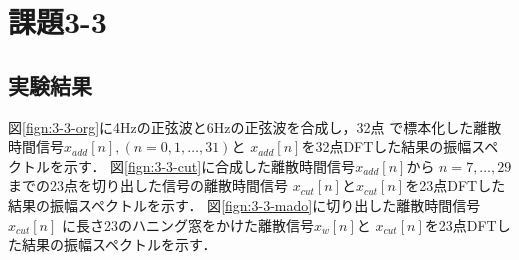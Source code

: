 \documentclass[11pt, a4paper, titlepage]{ltjsarticle}
\begin{document}
\newpage
\section*{課題3-3}
\subsection*{実験結果}
図\ref*{fign:3-3-org}に4Hzの正弦波と6Hzの正弦波を合成し，32点
で標本化した離散時間信号$x_{add}[n],(n=0,1,\dots,31)$と
$x_{add}[n]$を32点DFTした結果の振幅スペクトルを示す．
図\ref*{fign:3-3-cut}に合成した離散時間信号$x_{add}[n]$から
$n=7,\dots,29$までの23点を切り出した信号の離散時間信号
$x_{cut}[n]$と$x_{cut}[n]$を23点DFTした結果の振幅スペクトルを示す．
図\ref*{fign:3-3-mado}に切り出した離散時間信号$x_{cut}[n]$
に長さ23のハニング窓をかけた離散信号$x_{w}[n]$と
$x_{cut}[n]$を23点DFTした結果の振幅スペクトルを示す．
\end{document}
